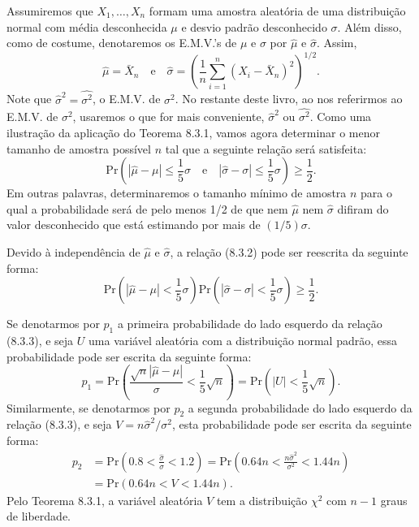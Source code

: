 Assumiremos que $X_1, \dots, X_n$ formam uma amostra aleatória de uma distribuição normal com média desconhecida $\mu$ e desvio padrão desconhecido $\sigma$. Além disso, como de costume, denotaremos os E.M.V.'s de $\mu$ e $\sigma$ por $\hat{\mu}$ e $\hat{\sigma}$. Assim,
$$
\hat{\mu} = \bar{X}_n \quad \text{e} \quad \hat{\sigma} = \left(\frac{1}{n}\sum_{i=1}^n(X_i - \bar{X}_n)^2\right)^{1/2}.
$$
Note que $\hat{\sigma}^2 = \hat{\sigma^2}$, o E.M.V. de $\sigma^2$. No restante deste livro, ao nos referirmos ao E.M.V. de $\sigma^2$, usaremos o que for mais conveniente, $\hat{\sigma}^2$ ou $\hat{\sigma^2}$. Como uma ilustração da aplicação do Teorema 8.3.1, vamos agora determinar o menor tamanho de amostra possível $n$ tal que a seguinte relação será satisfeita:
\begin{equation}
    \text{Pr}\left(|\hat{\mu} - \mu| \le \frac{1}{5}\sigma \quad \text{e} \quad |\hat{\sigma} - \sigma| \le \frac{1}{5}\sigma\right) \ge \frac{1}{2}.
\end{equation}
Em outras palavras, determinaremos o tamanho mínimo de amostra $n$ para o qual a probabilidade será de pelo menos 1/2 de que nem $\hat{\mu}$ nem $\hat{\sigma}$ difiram do valor desconhecido que está estimando por mais de $(1/5)\sigma$.

Devido à independência de $\hat{\mu}$ e $\hat{\sigma}$, a relação (8.3.2) pode ser reescrita da seguinte forma:
\begin{equation}
    \text{Pr}\left(|\hat{\mu} - \mu| < \frac{1}{5}\sigma\right) \text{Pr}\left(|\hat{\sigma} - \sigma| < \frac{1}{5}\sigma\right) \ge \frac{1}{2}.
\end{equation}

Se denotarmos por $p_1$ a primeira probabilidade do lado esquerdo da relação (8.3.3), e seja $U$ uma variável aleatória com a distribuição normal padrão, essa probabilidade pode ser escrita da seguinte forma:
$$
p_1 = \text{Pr}\left(\frac{\sqrt{n}|\hat{\mu}-\mu|}{\sigma} < \frac{1}{5}\sqrt{n}\right) = \text{Pr}\left(|U| < \frac{1}{5}\sqrt{n}\right).
$$
Similarmente, se denotarmos por $p_2$ a segunda probabilidade do lado esquerdo da relação (8.3.3), e seja $V = n\hat{\sigma}^2/\sigma^2$, esta probabilidade pode ser escrita da seguinte forma:
\begin{align*}
    p_2 &= \text{Pr}\left(0.8 < \frac{\hat{\sigma}}{\sigma} < 1.2\right) = \text{Pr}\left(0.64n < \frac{n\hat{\sigma}^2}{\sigma^2} < 1.44n\right) \\
    &= \text{Pr}(0.64n < V < 1.44n).
\end{align*}
Pelo Teorema 8.3.1, a variável aleatória $V$ tem a distribuição $\chi^2$ com $n-1$ graus de liberdade.

